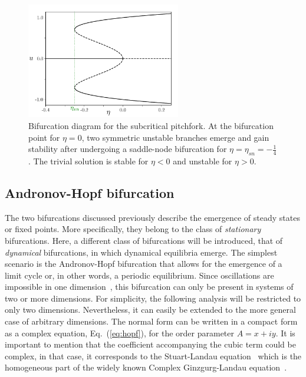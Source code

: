\begin{figure}[h]
    \centering
    \includegraphics[width=0.6\textwidth]{imagenes/framework/bif_pitch_subcritical.pdf}
    \caption{Bifurcation diagram for the subcritical pitchfork. At the bifurcation point
    for $\eta=0$, two symmetric unstable branches emerge and gain stability after undergoing
    a saddle-node bifurcation for $\eta=\eta_{sn}=-\frac14$. The trivial solution is stable for $\eta < 0$
    and unstable for $\eta > 0$.}
    \label{fig:pre_bif_subpitchfork}
\end{figure}


\subsection{Andronov-Hopf bifurcation}

The two bifurcations discussed previously describe the emergence of steady states or fixed points. 
More specifically, they belong to the class of {\em stationary} bifurcations. Here, a different class of bifurcations will be introduced,
that of {\em dynamical} bifurcations, in which dynamical equilibria emerge. The simplest scenario is the Andronov-Hopf bifurcation
that allows for the emergence of a limit cycle or, in other words, a periodic equilibrium. Since oscillations are impossible in 
one dimension~\cite{strogatz2018nonlinear}, this bifurcation can only be present in systems of two or more dimensions. For simplicity, the following
analysis will be restricted to only two dimensions. Nevertheless, it can easily be extended to the more general case of arbitrary dimensions.
The normal form can be written in a compact form as a complex equation, Eq.~(\ref{eq:hopf}), for the
order parameter $A = x +iy$. It is important to mention that
the coefficient accompanying the cubic term could be complex, in that case, it corresponds to
the Stuart-Landau equation~\cite{landau1944problem,stuart1958non} which
is the homogeneous part of the widely known Complex Ginzgurg-Landau equation~\cite{aranson2002world}.

